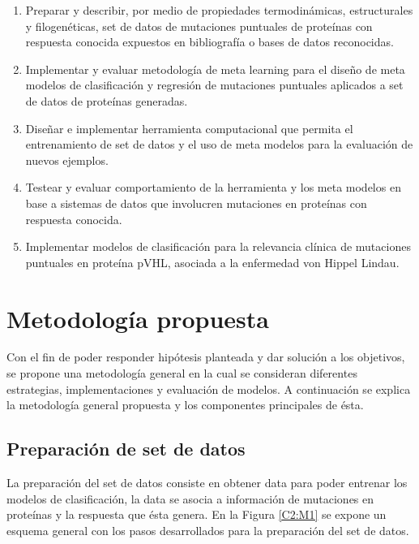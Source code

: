 \begin{enumerate}
	
	\item Preparar y describir, por medio de propiedades termodinámicas, estructurales y filogenéticas, set de datos de mutaciones puntuales de proteínas con respuesta conocida expuestos en bibliografía o bases de datos reconocidas.
	
	\item Implementar y evaluar metodología de meta learning para el diseño de meta modelos de clasificación y regresión de mutaciones puntuales aplicados a set de datos de proteínas generadas.
	
	\item Diseñar e implementar herramienta computacional que permita el entrenamiento de set de datos y el uso de meta modelos para la evaluación de nuevos ejemplos.
	
	\item Testear y evaluar comportamiento de la herramienta y los meta modelos en base a sistemas de datos que involucren mutaciones en proteínas con respuesta conocida.
	
	\item Implementar modelos de clasificación para la relevancia clínica de mutaciones puntuales en proteína pVHL, asociada a la enfermedad von Hippel Lindau. 
	
\end{enumerate}

\section{Metodología propuesta}

Con el fin de poder responder hipótesis planteada y dar solución a los objetivos, se propone una metodología general en la cual se consideran diferentes estrategias, implementaciones y evaluación de modelos. A continuación se explica la metodología general propuesta y los componentes principales de ésta.

\subsection{Preparación de set de datos}

La preparación del set de datos consiste en obtener data para poder entrenar los modelos de clasificación, la data se asocia a información de mutaciones en proteínas y la respuesta que ésta genera. En la Figura \ref{C2:M1} se expone un esquema general con los pasos desarrollados para la preparación del set de datos.

